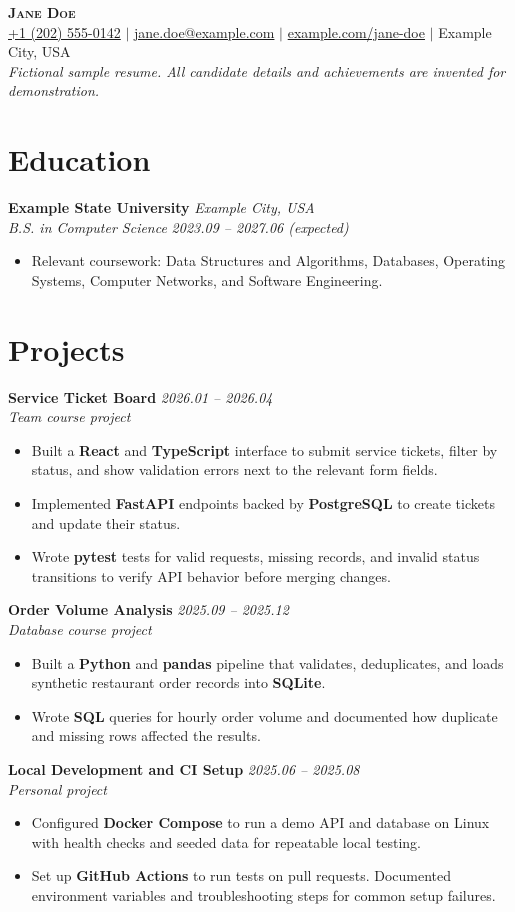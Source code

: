 \documentclass[11pt, letterpaper]{extarticle}
\newcommand{\resumeItem}[1]{\item\small{#1\vspace{-2pt}}}
\newcommand{\resumeSubheading}[4]{\vspace{6pt}\textbf{#1} \hfill \textit{#2}\\
\textit{#3} \hfill \textit{#4}\vspace{1pt}}
\newcommand{\resumeItemListStart}{\begin{itemize}[leftmargin=0.18in, itemsep=2pt, topsep=0pt]}
\newcommand{\resumeItemListEnd}{\end{itemize}\vspace{-3pt}}
\begin{document}
\begin{center}
    \textbf{\Huge \scshape Jane Doe} \\ \vspace{3pt}
    \small
    \underline{+1 (202) 555-0142} $|$
    \underline{jane.doe@example.com} $|$
    \underline{example.com/jane-doe} $|$
    Example City, USA \\ \vspace{3pt}
    {\scriptsize\textit{Fictional sample resume. All candidate details and achievements are invented for demonstration.}}
\end{center}

\section{Education}
\resumeSubheading{Example State University}{Example City, USA}{B.S. in Computer Science}{2023.09 -- 2027.06 (expected)}
\resumeItemListStart
  \resumeItem{Relevant coursework: Data Structures and Algorithms, Databases, Operating Systems, Computer Networks, and Software Engineering.}
\resumeItemListEnd

\section{Projects}
\resumeSubheading{Service Ticket Board}{2026.01 -- 2026.04}{Team course project}{}
\resumeItemListStart
  \resumeItem{Built a \textbf{React} and \textbf{TypeScript} interface to submit service tickets, filter by status, and show validation errors next to the relevant form fields.}
  \resumeItem{Implemented \textbf{FastAPI} endpoints backed by \textbf{PostgreSQL} to create tickets and update their status.}
  \resumeItem{Wrote \textbf{pytest} tests for valid requests, missing records, and invalid status transitions to verify API behavior before merging changes.}
\resumeItemListEnd

\resumeSubheading{Order Volume Analysis}{2025.09 -- 2025.12}{Database course project}{}
\resumeItemListStart
  \resumeItem{Built a \textbf{Python} and \textbf{pandas} pipeline that validates, deduplicates, and loads synthetic restaurant order records into \textbf{SQLite}.}
  \resumeItem{Wrote \textbf{SQL} queries for hourly order volume and documented how duplicate and missing rows affected the results.}
\resumeItemListEnd

\resumeSubheading{Local Development and CI Setup}{2025.06 -- 2025.08}{Personal project}{}
\resumeItemListStart
  \resumeItem{Configured \textbf{Docker Compose} to run a demo API and database on Linux with health checks and seeded data for repeatable local testing.}
  \resumeItem{Set up \textbf{GitHub Actions} to run tests on pull requests. Documented environment variables and troubleshooting steps for common setup failures.}
\resumeItemListEnd
\end{document}
